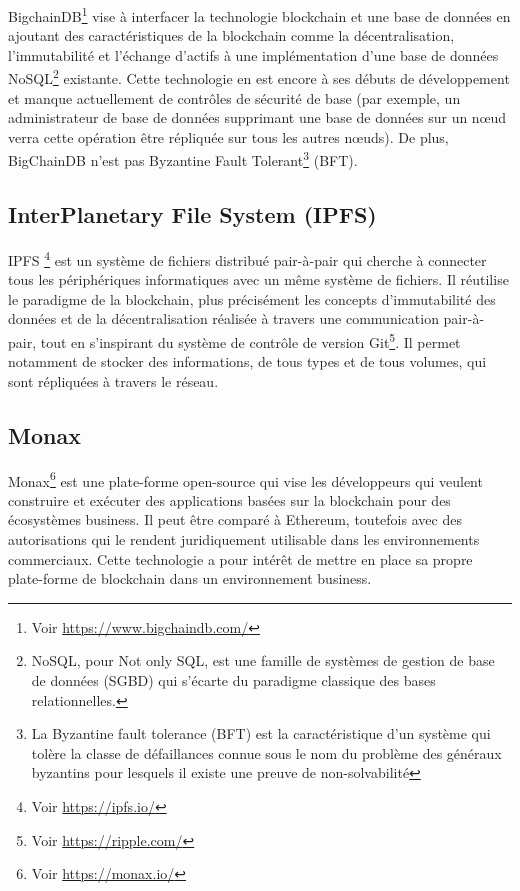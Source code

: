 \documentclass{tnreport}
\begin{document}
BigchainDB\footnote{Voir \url{https://www.bigchaindb.com/}} vise à interfacer la technologie blockchain et une base de données en ajoutant des caractéristiques de la blockchain comme la décentralisation, l'immutabilité et l'échange d'actifs à une implémentation d'une base de données NoSQL\footnote{NoSQL, pour Not only SQL, est une famille de systèmes de gestion de base de données (SGBD) qui s'écarte du paradigme classique des bases relationnelles.} existante. Cette technologie en est encore à ses débuts de développement et manque actuellement de contrôles de sécurité de base (par exemple, un administrateur de base de données supprimant une base de données sur un nœud verra cette opération être répliquée sur tous les autres nœuds). De plus, BigChainDB n'est pas Byzantine Fault Tolerant\footnote{	La Byzantine fault tolerance (BFT) est la caractéristique d'un système qui tolère la classe de défaillances connue sous le nom du problème des généraux byzantins pour lesquels il existe une preuve de non-solvabilité} (BFT).

\subsection{InterPlanetary File System (IPFS)}

IPFS \footnote{Voir \url{https://ipfs.io/}} est un système de fichiers distribué pair-à-pair qui cherche à connecter tous les périphériques informatiques avec un même système de fichiers. Il réutilise le paradigme de la blockchain, plus précisément les concepts d'immutabilité des données et de la décentralisation réalisée à travers une communication pair-à-pair, tout en s'inspirant du système de contrôle de version Git\footnote{Voir \url{https://ripple.com/}}. Il permet notamment de stocker des informations, de tous types et de tous volumes, qui sont répliquées à travers le réseau. 

\subsection{Monax}

Monax\footnote{Voir \url{https://monax.io/}} est une plate-forme open-source qui vise les développeurs qui veulent construire et exécuter des applications basées sur la blockchain pour des écosystèmes business. Il peut être comparé à Ethereum, toutefois avec des autorisations qui le rendent juridiquement utilisable dans les environnements commerciaux. Cette technologie a pour intérêt de mettre en place sa propre plate-forme de blockchain dans un environnement business.
\end{document}
